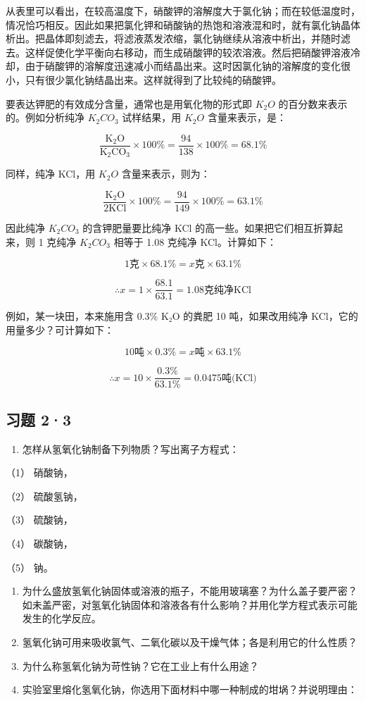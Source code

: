 从表里可以看出，在较高温度下，硝酸钾的溶解度大于氯化钠；而在较低温度时，情况恰巧相反。因此如果把氯化钾和硝酸钠的热饱和溶液混和时，就有氯化钠晶体析出。把晶体即刻滤去，将滤液蒸发浓缩，氯化钠继续从溶液中析出，并随时滤去。这样促使化学平衡向右移动，而生成硝酸钾的较浓溶液。然后把硝酸钾溶液冷却，由于硝酸钾的溶解度迅速减小而结晶出来。这时因氯化钠的溶解度的变化很小，只有很少氯化钠结晶出来。这样就得到了比较纯的硝酸钾。

要表达钾肥的有效成分含量，通常也是用氧化物的形式即 \(K_{2}O\)
的百分数来表示的。例如分析纯净 \(K_{2}CO_{3}\) 试样结果，用 \(K_{2}O\)
含量来表示，是：

\[
\frac {\mathrm{K} _ {2} \mathrm{O}}{\mathrm{K} _ {2} \mathrm{CO} _ {3}} \times 100 \% = \frac {94}{138} \times 100 \% = 68.1 \%
\]

同样，纯净 KCl，用 \(K_{2}O\) 含量来表示，则为：

\[
\frac {\mathrm{K} _ {2} \mathrm{O}}{2 \mathrm{KCl}} \times 100 \% = \frac {94}{149} \times 100 \% = 63.1 \%
\]

因此纯净 \(K_{2}CO_{3}\) 的含钾肥量要比纯净 KCl
的高一些。如果把它们相互折算起来，则 1 克纯净 \(K_{2}CO_{3}\) 相等于
1.08 克纯净 KCl。计算如下：

\[
1 \text{克} \times 68.1\% = x \text{克} \times 63.1\%
\]

\[
\therefore x = 1 \times \frac {68.1}{63.1} = 1.08 \text{克纯净KCl}
\]

例如，某一块田，本来施用含 0.3\% K₂O 的粪肥 10 吨，如果改用纯净
KCl，它的用量多少？可计算如下：

\[
10 \text{吨} \times 0.3\% = x \text{吨} \times 63.1\%
\]

\[
\therefore x = 10 \times \frac{0.3\%}{63.1\%} = 0.0475\text{吨(KCl)}
\]

\subsection{习题 2·3}

\begin{enumerate}
\item
  怎样从氢氧化钠制备下列物质？写出离子方程式：
\end{enumerate}

（1） 硝酸钠，

（2） 硫酸氢钠，

（3） 硫酸钠，

（4） 碳酸钠，

（5） 钠。

\begin{enumerate}[start=2]
\item
  为什么盛放氢氧化钠固体或溶液的瓶子，不能用玻璃塞？为什么盖子要严密？如未盖严密，对氢氧化钠固体和溶液各有什么影响？并用化学方程式表示可能发生的化学反应。
\item
  氢氧化钠可用来吸收氯气、二氧化碳以及干燥气体；各是利用它的什么性质？
\item
  为什么称氢氧化钠为苛性钠？它在工业上有什么用途？
\item
  实验室里熔化氢氧化钠，你选用下面材料中哪一种制成的坩埚？并说明理由：
\end{enumerate}


